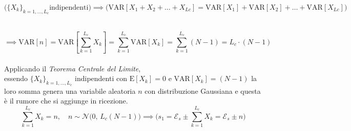 \documentclass[12pt, a4paper]{article}
\begin{document}
\[
\Bigg( \{X_k\}_{k=1,\dots,L_c}	\text{indipendenti} \Bigg) \implies \Bigg(
\mathrm{VAR}[X_1+X_2+\dots+X_{Lc}] = \mathrm{VAR}[X_1]+\mathrm{VAR}[X_2]+\dots+\mathrm{VAR}[X_{Lc}] \Bigg)
\] \\\vspace{-1.2cm} 

\[
\implies \mathrm{VAR}[n] = \mathrm{VAR}\left[ \sum_{k=1}^{L_c}X_k \right] =
\sum_{k=1}^{L_c}\mathrm{VAR}\left[ X_k \right] = 
\sum_{k=1}^{L_c}\left( N-1 \right) = 
L_c \cdot (N-1)
\] \\
Applicando il \textit{Teorema Centrale del Limite},\\
essendo $\{X_k\}_{k=1,\dots,L_c}$
indipendenti con $\mathrm{E}[X_k]=0$ e $\mathrm{VAR}[X_k]=(N-1)$ la loro somma genera una variabile aleatoria $n$ con distribuzione Gaussiana e questa è il rumore che si aggiunge in ricezione.
\[
\sum_{k=1}^{L_c}X_k = n, \quad\boxed{ n\sim\mathcal{N}\Big(0,\, L_c(N-1)\Big) }
\implies \Bigg( s_1 = \mathcal{E}_s \pm \sum_{k=1}^{L_c}X_k = \mathcal{E}_s \pm n \Bigg)
\]
\end{document}
